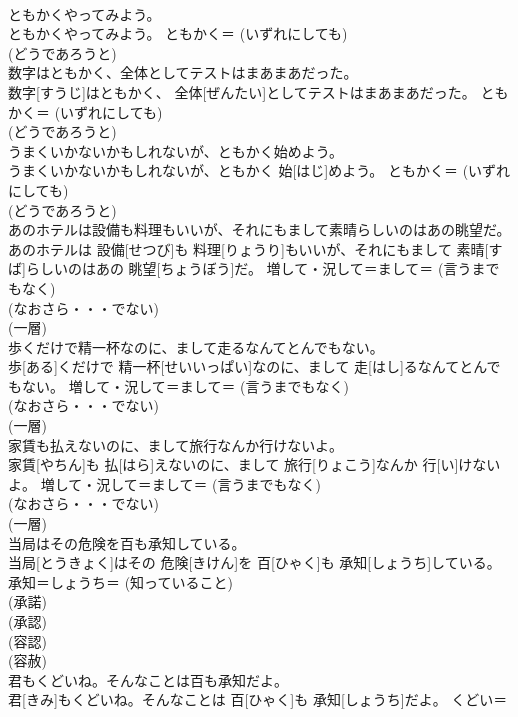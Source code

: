 \documentclass[8pt]{extreport}
\begin{document}
\begin{CJK}{UTF8}{min}
{\\	ともかくやってみよう。	
\\	ともかくやってみよう。	ともかく＝ (いずれにしても) 
\\	(どうであろうと) 
\\	数字はともかく、全体としてテストはまあまあだった。	
\\	数字[すうじ]はともかく、 全体[ぜんたい]としてテストはまあまあだった。	ともかく＝ (いずれにしても) 
\\	(どうであろうと) 
\\	うまくいかないかもしれないが、ともかく始めよう。	
\\	うまくいかないかもしれないが、ともかく 始[はじ]めよう。	ともかく＝ (いずれにしても) 
\\	(どうであろうと) 
\\	あのホテルは設備も料理もいいが、それにもまして素晴らしいのはあの眺望だ。	
\\	あのホテルは 設備[せつび]も 料理[りょうり]もいいが、それにもまして 素晴[すば]らしいのはあの 眺望[ちょうぼう]だ。	増して・況して＝まして＝ (言うまでもなく) 
\\	(なおさら・・・でない) 
\\	(一層) 
\\	歩くだけで精一杯なのに、まして走るなんてとんでもない。	
\\	歩[ある]くだけで 精一杯[せいいっぱい]なのに、まして 走[はし]るなんてとんでもない。	増して・況して＝まして＝ (言うまでもなく) 
\\	(なおさら・・・でない) 
\\	(一層) 
\\	家賃も払えないのに、まして旅行なんか行けないよ。	
\\	家賃[やちん]も 払[はら]えないのに、まして 旅行[りょこう]なんか 行[い]けないよ。	増して・況して＝まして＝ (言うまでもなく) 
\\	(なおさら・・・でない) 
\\	(一層) 
\\	当局はその危険を百も承知している。	
\\	当局[とうきょく]はその 危険[きけん]を 百[ひゃく]も 承知[しょうち]している。	承知＝しょうち＝ (知っていること) 
\\	(承諾) 
\\	(承認) 
\\	(容認) 
\\	(容赦)
\\	君もくどいね。そんなことは百も承知だよ。	
\\	君[きみ]もくどいね。そんなことは 百[ひゃく]も 承知[しょうち]だよ。	くどい＝ 
}
\end{CJK}
\end{document}
